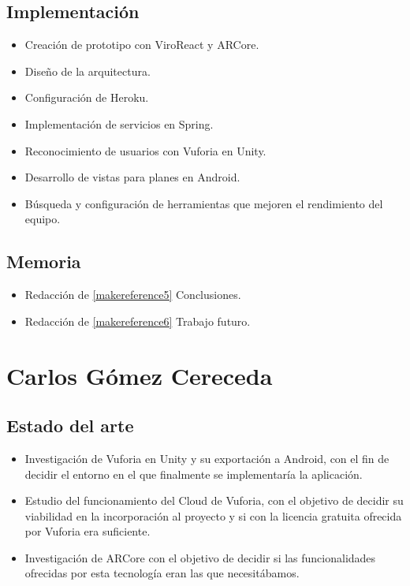     \subsection{Implementación}
    \label{makereference7.2.3}
        \begin{itemize}
            \item Creación de prototipo con ViroReact y ARCore.
            \item Diseño de la arquitectura.
            \item Configuración de Heroku.
            \item Implementación de servicios en Spring.
            \item Reconocimiento de usuarios con Vuforia en Unity.
            \item Desarrollo de vistas para planes en Android.
            \item Búsqueda y configuración de herramientas que mejoren el
             rendimiento del equipo.
        \end{itemize}
    \subsection{Memoria}
    \label{makereference7.2.3}
        \begin{itemize}
            \item Redacción de \autoref{makereference5} Conclusiones.
            \item Redacción de \autoref{makereference6} Trabajo futuro.
        \end{itemize}

        \section{Carlos Gómez Cereceda}
        \label{makereference7.3}
            \subsection{Estado del arte}
            \label{makereference7.3.1}
                \begin{itemize}
                    \item Investigación de Vuforia en Unity y su exportación a Android, con el fin de decidir el entorno en el que 
                    finalmente se implementaría la aplicación. 
                    \item Estudio del funcionamiento del Cloud de Vuforia, con el objetivo de decidir su viabilidad en la incorporación 
                    al proyecto y si con la licencia gratuita ofrecida por Vuforia era suficiente. 
                    \item Investigación de ARCore con el objetivo de decidir si las funcionalidades ofrecidas por esta tecnología eran las que necesitábamos.
                \end{itemize}
